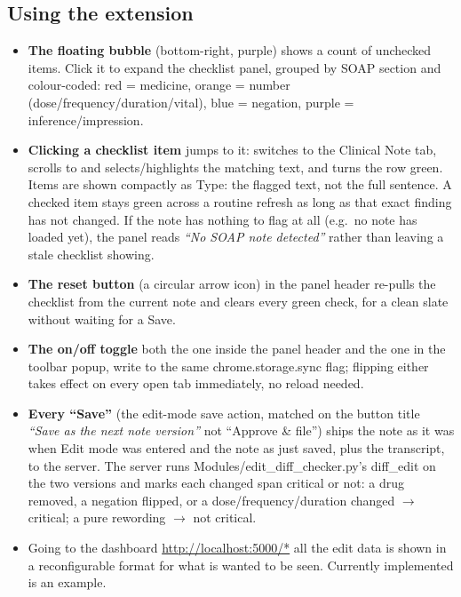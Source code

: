 \documentclass[11pt,a4paper]{article}
\begin{document}
\subsection{Using the extension}

\begin{itemize}
  \item \textbf{The floating bubble} (bottom-right, purple) shows a count of
  unchecked items. Click it to expand the checklist panel, grouped by SOAP
  section and colour-coded: red = medicine, orange = number
  (dose/frequency/duration/vital), blue = negation, purple =
  inference/impression. 
  
  \item \textbf{Clicking a checklist item} jumps to it: switches to the
  Clinical Note tab, scrolls to and selects/highlights the matching text,
  and turns the row green. Items are shown compactly as Type: the
  flagged text, not the full sentence. A checked item stays green across a
  routine refresh as long as that exact finding has not changed. If the note has nothing to flag at
  all (e.g.\ no note has loaded yet), the panel reads \emph{``No SOAP note
  detected''} rather than leaving a stale checklist showing.
  \item \textbf{The reset button} (a circular arrow icon)
  in the panel header re-pulls the checklist from the current note and clears
  every green check, for a clean slate without waiting for a Save.
  
  \item \textbf{The on/off toggle} both the one inside the panel header
  and the one in the toolbar popup, write to the same
 chrome.storage.sync flag; flipping either takes effect on every
  open tab immediately, no reload needed.
  
  \item \textbf{Every ``Save''} (the edit-mode save action, matched on the
  button title \emph{``Save as the next note version''} not ``Approve \&
  file'') ships the note as it was when Edit mode was entered and the note
  as just saved, plus the transcript, to the server. The server runs
  Modules/edit\_diff\_checker.py's  diff\_edit on the two versions
  and marks each changed span critical or not: a drug removed, a negation
  flipped, or a dose/frequency/duration changed \(\to\) critical; a pure
  rewording \(\to\) not critical.

  \item Going to the dashboard \url{http://localhost:5000/*} all the edit data is shown in a reconfigurable format for what is wanted to be seen. Currently implemented is an example.
\end{itemize}
\end{document}
